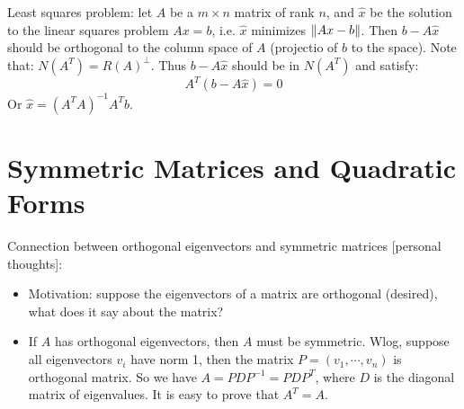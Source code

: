 \documentclass{report}
\begin{document}
Least squares problem: let $A$ be a $m \times n$ matrix of rank $n$, and $\hat{x}$ be the solution to the linear squares problem $Ax = b$, i.e. $\hat{x}$ minimizes $\lVert Ax - b\rVert$. Then $b - A\hat{x}$ should be orthogonal to the column space of $A$ (projectio of $b$ to the space). Note that: $N(A^T) = R(A)^{\bot}$. Thus $b - A \hat{x}$ should be in $N(A^T)$ and satisfy:
\begin{equation}
A^T (b - A \hat{x}) = 0	
\end{equation}
Or $\hat{x} = (A^T A)^{-1} A^T b$.  

\section{Symmetric Matrices and Quadratic Forms}

Connection between orthogonal eigenvectors and symmetric matrices [personal thoughts]: 
\begin{itemize}
	\item Motivation: suppose the eigenvectors of a matrix are orthogonal (desired), what does it say about the matrix? 
	
	\item If $A$ has orthogonal eigenvectors, then $A$ must be symmetric. Wlog, suppose all eigenvectors $v_i$ have norm 1, then the matrix $P = (v_1, \cdots, v_n)$ is orthogonal matrix. So we have $A = PDP^{-1} = PD P^T$, where $D$ is the diagonal matrix of eigenvalues. It is easy to prove that $A^T = A$. 
\end{itemize}
\end{document}
